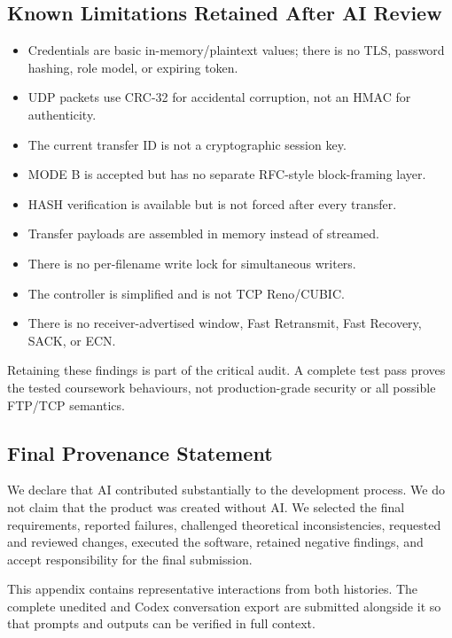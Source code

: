 \subsection{Known Limitations Retained After AI Review}

\begin{itemize}
  \item Credentials are basic in-memory/plaintext values; there is no TLS,
        password hashing, role model, or expiring token.
  \item UDP packets use CRC-32 for accidental corruption, not an HMAC for
        authenticity.
  \item The current transfer ID is not a cryptographic session key.
  \item MODE B is accepted but has no separate RFC-style block-framing layer.
  \item HASH verification is available but is not forced after every transfer.
  \item Transfer payloads are assembled in memory instead of streamed.
  \item There is no per-filename write lock for simultaneous writers.
  \item The controller is simplified and is not TCP Reno/CUBIC.
  \item There is no receiver-advertised window, Fast Retransmit, Fast
        Recovery, SACK, or ECN.
\end{itemize}

Retaining these findings is part of the critical audit. A complete test pass
proves the tested coursework behaviours, not production-grade security or
all possible FTP/TCP semantics.



\subsection{Final Provenance Statement}

We declare that AI contributed substantially to the development process. We
do not claim that the product was created without AI. We selected the final
requirements, reported failures, challenged theoretical inconsistencies,
requested and reviewed changes, executed the software, retained negative
findings, and accept responsibility for the final submission.

This appendix contains representative interactions from both histories. The
complete unedited  and Codex conversation export are submitted
alongside it so that prompts and outputs can be verified in full context.
